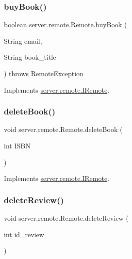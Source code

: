 \subsubsection{\texorpdfstring{buy\+Book()}{buyBook()}}
{\footnotesize\ttfamily boolean server.\+remote.\+Remote.\+buy\+Book (\begin{DoxyParamCaption}\item[{String}]{email,  }\item[{String}]{book\+\_\+title }\end{DoxyParamCaption}) throws Remote\+Exception}



Implements \hyperlink{interfaceserver_1_1remote_1_1_i_remote_a5ecb918e7d2650346770f3ff5676c25b}{server.\+remote.\+I\+Remote}.

\mbox{\label{classserver_1_1remote_1_1_remote_a013ab36d40de824c6ad7a48f59d12684}} 
\subsubsection{\texorpdfstring{delete\+Book()}{deleteBook()}}
{\footnotesize\ttfamily void server.\+remote.\+Remote.\+delete\+Book (\begin{DoxyParamCaption}\item[{int}]{I\+S\+BN }\end{DoxyParamCaption})}



Implements \hyperlink{interfaceserver_1_1remote_1_1_i_remote_ac64967dff86a9c603d0c9eb815f222df}{server.\+remote.\+I\+Remote}.

\mbox{\label{classserver_1_1remote_1_1_remote_ab80b5addc446fe5f1ecf9a522794ff4f}} 
\subsubsection{\texorpdfstring{delete\+Review()}{deleteReview()}}
{\footnotesize\ttfamily void server.\+remote.\+Remote.\+delete\+Review (\begin{DoxyParamCaption}\item[{int}]{id\+\_\+review }\end{DoxyParamCaption})}



